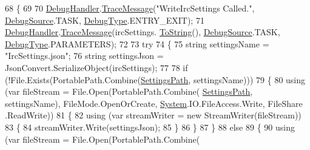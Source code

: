 \begin{DoxyCode}
68         \{
69 
70             \mbox{\hyperlink{class_little_weeb_library_1_1_handlers_1_1_settings_handler_a80da61f3a3fcbb5f9ac6057591a98acf}{DebugHandler}}.\mbox{\hyperlink{interface_little_weeb_library_1_1_handlers_1_1_i_debug_handler_a2e405bc3492e683cd3702fae125221bc}{TraceMessage}}(\textcolor{stringliteral}{"WriteIrcSettings Called."}, 
      \mbox{\hyperlink{namespace_little_weeb_library_1_1_handlers_a2a6ca0775121c9c503d58aa254d292be}{DebugSource}}.TASK, \mbox{\hyperlink{namespace_little_weeb_library_1_1_handlers_ab66019ed40462876ec4e61bb3ccb0a62}{DebugType}}.ENTRY\_EXIT);
71             \mbox{\hyperlink{class_little_weeb_library_1_1_handlers_1_1_settings_handler_a80da61f3a3fcbb5f9ac6057591a98acf}{DebugHandler}}.\mbox{\hyperlink{interface_little_weeb_library_1_1_handlers_1_1_i_debug_handler_a2e405bc3492e683cd3702fae125221bc}{TraceMessage}}(ircSettings.
      \mbox{\hyperlink{class_little_weeb_library_1_1_settings_1_1_irc_settings_a2e1d7f26d7d3083d19c3a9e6c6c2d0b2}{ToString}}(), \mbox{\hyperlink{namespace_little_weeb_library_1_1_handlers_a2a6ca0775121c9c503d58aa254d292be}{DebugSource}}.TASK, \mbox{\hyperlink{namespace_little_weeb_library_1_1_handlers_ab66019ed40462876ec4e61bb3ccb0a62}{DebugType}}.PARAMETERS);
72 
73             \textcolor{keywordflow}{try}
74             \{
75                 \textcolor{keywordtype}{string} settingsName = \textcolor{stringliteral}{"IrcSettings.json"};
76                 \textcolor{keywordtype}{string} settingsJson = JsonConvert.SerializeObject(ircSettings);
77 
78                 \textcolor{keywordflow}{if} (!File.Exists(PortablePath.Combine(\mbox{\hyperlink{class_little_weeb_library_1_1_handlers_1_1_settings_handler_a2e309fc6b949f0bb7e7ace8c2017be7f}{SettingsPath}}, settingsName)))
79                 \{
80                     \textcolor{keyword}{using} (var fileStream = File.Open(PortablePath.Combine(
      \mbox{\hyperlink{class_little_weeb_library_1_1_handlers_1_1_settings_handler_a2e309fc6b949f0bb7e7ace8c2017be7f}{SettingsPath}}, settingsName), FileMode.OpenOrCreate, \mbox{\hyperlink{namespace_system}{System}}.IO.FileAccess.Write, FileShare
      .ReadWrite))
81                     \{
82                         \textcolor{keyword}{using} (var streamWriter = \textcolor{keyword}{new} StreamWriter(fileStream))
83                         \{
84                             streamWriter.Write(settingsJson);
85                         \}
86                     \}
87                 \}
88                 \textcolor{keywordflow}{else}
89                 \{
90                     \textcolor{keyword}{using} (var fileStream = File.Open(PortablePath.Combine(

\end{DoxyCode}
